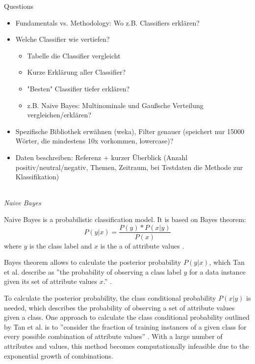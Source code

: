 Questions
\begin{itemize}
    \item Fundamentals vs. Methodology: Wo z.B. Classifiers erklären?
    \item Welche Classifier wie vertiefen?
    \begin{itemize}
    \item Tabelle die Classifier vergleicht
    \item Kurze Erklärung aller Classifier?
    \item "Besten" Classifier tiefer erklären?
    \item z.B. Naive Bayes: Multinominale und Gaußsche Verteilung vergleichen/erklären?
    \end{itemize}
    \item Spezifische Bibliothek erwähnen (weka), Filter genauer (speichert nur 15000 Wörter, die mindestens 10x vorkommen, lowercase)?
    \item Daten beschreiben: Referenz + kurzer Überblick (Anzahl positiv/neutral/negativ, Themen, Zeitraum, bei Testdaten die Methode zur Klassifikation)
\end{itemize}
\ \\

\emph{Naive Bayes}

Naive Bayes is a probabilistic classification model. It is based on Bayes theorem:
\begin{equation}
\label{eq:bayes}
            P(y|x) = \frac{P(y) * P(x|y)}{P(x)}
\end{equation}
where $y$ is the class label and $x$ is the a of attribute values \cite{DBLP:books/aw/TanSKK2019}. 

Bayes theorem allows to calculate the posterior probability $P(y|x)$, which Tan et al. describe as ''the probability of observing a class label $y$ for a data instance given its set of attribute values $x$.'' \cite[p.~418]{DBLP:books/aw/TanSKK2019}. 

To calculate the posterior probability, the class conditional probability $P(x|y)$ is needed, which describes the probability of observing a set of attribute values given a class. One approach to calculate the class conditional probability outlined by Tan et al. is to ''consider the fraction of training instances of a given class for every possible combination of attribute values'' \cite[p.~419]{DBLP:books/aw/TanSKK2019}. With a large number of attributes and values, this method becomes computationally infeasible due to the exponential growth of combinations. \cite{DBLP:books/aw/TanSKK2019}

